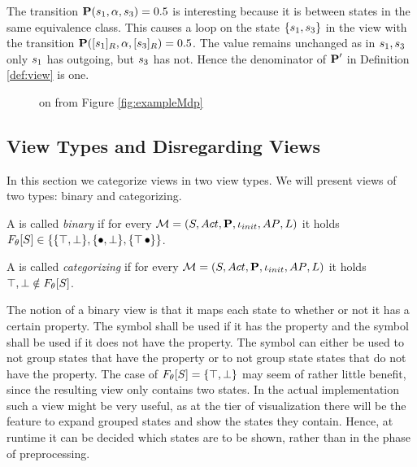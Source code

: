 \documentclass[preview]{standalone}
\begin{document}
\begin{exmp}
The transition ${{\textbf{P}}}({s}_1,{\alpha},{s}_3) = 0.5$ is interesting because it is between states in the same equivalence class. This causes a loop on the state $\{{s}_1,{s}_3\}$ in the view \view with the transition ${{\textbf{P}}}({{[{s}_1]_{{R}}}},{\alpha},{{[{s}_3]_{{R}}}}) = 0.5$. The value remains unchanged as in ${s}_1,{s}_3$ only ${s}_1$ has \action outgoing, but ${s}_3$ has not. Hence the denominator of ${{\textbf{P}}}'$ in Definition \ref{def:view} is one.

\begin{figure}[!htb]
	\centering 
	\caption{\viewNC \view on \chgphN \chgph from Figure \ref{fig:exampleMdp}}
	\label{fig:exampleView}  
\end{figure}
\end{exmp}

\subsection{View Types and Disregarding Views}
In this section we categorize views in two view types. We will present views of two types: binary and categorizing.

\begin{definition}
	\sloppy
	A \viewN \view is called \emph{binary} if for every \chgphN ${{{\mathcal{M}}}} = {{({S}, {Act}, {\textbf{P}}, {\iota_{init}}, {AP}, {L})}}$ it holds ${{F_{{\theta}}}}[{S}] \in \{\{{\top}, {\bot}\}, \{{\bullet}, {\bot}\}, \{{\top}\, {\bullet}\}\}$. 
	
	\noindent
	A \viewN \view is called \emph{categorizing} if for every \chgphN ${{{\mathcal{M}}}} = {{({S}, {Act}, {\textbf{P}}, {\iota_{init}}, {AP}, {L})}}$ it holds ${\top}, {\bot} \notin {\ensuremath{{F_{{\theta}}}}}[{S}]$. 
	\label{def:viewtypes}
\end{definition}

The notion of a binary view is that it maps each state to whether or not it has a certain property. The symbol \hasppty shall be used if it has the property and the symbol \notppty shall be used if it does not have the property. The symbol \remelem can either be used to not group states that have the property or to not group state states that do not have the property. The case of ${{F_{{\theta}}}}[{S}] = \{{\top}, {\bot}\}$ may seem of rather little benefit, since the resulting view only contains two states. In the actual implementation such a view might be very useful, as at the tier of visualization there will be the feature to expand grouped states and show the states they contain. Hence, at runtime it can be decided which states are to be shown, rather than in the phase of preprocessing.
\end{document}
